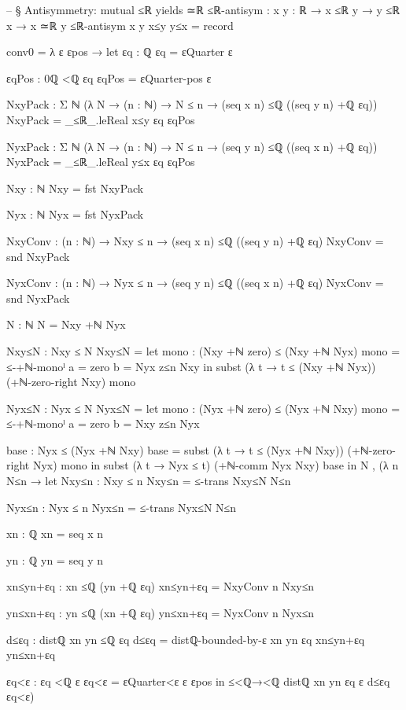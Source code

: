 \documentclass[11pt,a4paper]{book}
\begin{document}
\begin{code}
-- § Antisymmetry: mutual ≤ℝ yields ≃ℝ
≤ℝ-antisym : {x y : ℝ} → x ≤ℝ y → y ≤ℝ x → x ≃ℝ y
≤ℝ-antisym {x} {y} x≤y y≤x = record
  { conv0 = λ ε εpos →
      let
        εq : ℚ
        εq = εQuarter ε

        εqPos : 0ℚ <ℚ εq
        εqPos = εQuarter-pos ε

        NxyPack : Σ ℕ (λ N → (n : ℕ) → N ≤ n → (seq x n) ≤ℚ ((seq y n) +ℚ εq))
        NxyPack = _≤ℝ_.leReal x≤y εq εqPos

        NyxPack : Σ ℕ (λ N → (n : ℕ) → N ≤ n → (seq y n) ≤ℚ ((seq x n) +ℚ εq))
        NyxPack = _≤ℝ_.leReal y≤x εq εqPos

        Nxy : ℕ
        Nxy = fst NxyPack

        Nyx : ℕ
        Nyx = fst NyxPack

        NxyConv : (n : ℕ) → Nxy ≤ n → (seq x n) ≤ℚ ((seq y n) +ℚ εq)
        NxyConv = snd NxyPack

        NyxConv : (n : ℕ) → Nyx ≤ n → (seq y n) ≤ℚ ((seq x n) +ℚ εq)
        NyxConv = snd NyxPack

        N : ℕ
        N = Nxy +ℕ Nyx

        Nxy≤N : Nxy ≤ N
        Nxy≤N =
          let
            mono : (Nxy +ℕ zero) ≤ (Nxy +ℕ Nyx)
            mono = ≤-+ℕ-monoˡ {a = zero} {b = Nyx} z≤n Nxy
          in
          subst (λ t → t ≤ (Nxy +ℕ Nyx)) (+ℕ-zero-right Nxy) mono

        Nyx≤N : Nyx ≤ N
        Nyx≤N =
          let
            mono : (Nyx +ℕ zero) ≤ (Nyx +ℕ Nxy)
            mono = ≤-+ℕ-monoˡ {a = zero} {b = Nxy} z≤n Nyx

            base : Nyx ≤ (Nyx +ℕ Nxy)
            base = subst (λ t → t ≤ (Nyx +ℕ Nxy)) (+ℕ-zero-right Nyx) mono
          in
          subst (λ t → Nyx ≤ t) (+ℕ-comm Nyx Nxy) base
      in
      N , (λ n N≤n →
        let
          Nxy≤n : Nxy ≤ n
          Nxy≤n = ≤-trans Nxy≤N N≤n

          Nyx≤n : Nyx ≤ n
          Nyx≤n = ≤-trans Nyx≤N N≤n

          xn : ℚ
          xn = seq x n

          yn : ℚ
          yn = seq y n

          xn≤yn+εq : xn ≤ℚ (yn +ℚ εq)
          xn≤yn+εq = NxyConv n Nxy≤n

          yn≤xn+εq : yn ≤ℚ (xn +ℚ εq)
          yn≤xn+εq = NyxConv n Nyx≤n

          d≤εq : distℚ xn yn ≤ℚ εq
          d≤εq = distℚ-bounded-by-ε xn yn εq xn≤yn+εq yn≤xn+εq

          εq<ε : εq <ℚ ε
          εq<ε = εQuarter<ε ε εpos
        in
        ≤<ℚ→<ℚ {distℚ xn yn} {εq} {ε} d≤εq εq<ε)
  }
\end{code}
\end{document}
